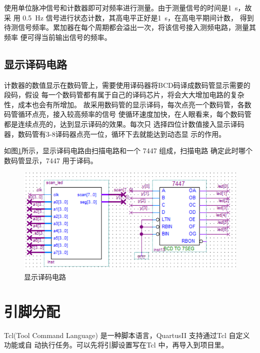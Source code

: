 \documentclass[twoside, openright]{article}
\begin{document}
使用单位脉冲信号和计数器即可对频率进行测量。由于测量信号的时间是\SI{1}{\s}，故采
用 \SI{0.5}{\Hz} 信号进行状态计数，其高电平正好是\SI{1}{\s}，在高电平期间计数，
得到待测信号频率。累加器在每个周期都会溢出一次，将该信号接入测频电路，测量其频率
便可得当前输出信号的频率。


\subsection{显示译码电路}%
\label{sub:显示译码电路}

计数器的数值显示在数码管上，需要使用译码器将BCD码译成数码管显示需要的段码，假设
每一个数码管都有属于自己的译码芯片，将会大大增加电路的复杂性，成本也会有所增加。
故采用数码管的显示译码，每次点亮一个数码管，各数码管循环点亮，接入较高频率的信号
使循环速度加快，在人眼看来，每个数码管都是连续点亮的，达到显示译码的效果。每次只
选择四位计数值接入显示译码器，数码管有3-8译码器点亮一位，循环下去就能达到动态显
示的作用。

如图\ref{fig:显示译码电路}所示，显示译码电路由扫描电路和一个 7447 组成，扫描电路
确定此时哪个数码管显示，7447 用于译码。


\begin{figure}[htbp]
	\centering
	\includegraphics[width = 0.8\linewidth]{display.png}
	\caption{显示译码电路}
	\label{fig:显示译码电路}
\end{figure}

\section{引脚分配}%
\label{sec:引脚分配}

Tcl(Tool Command Language) 是一种脚本语言，QuartusII 支持通过Tcl 自定义功能或自
动执行任务。可以先将引脚设置写在Tcl 中，再导入到项目里。
\end{document}
